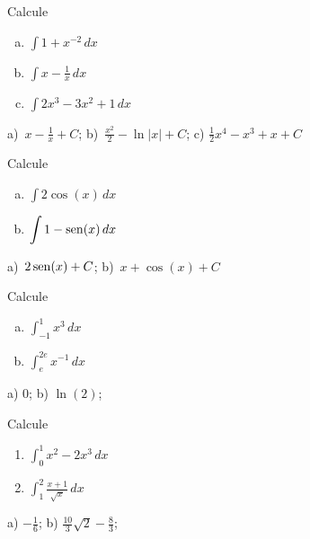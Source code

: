 \begin{exer}
  Calcule
  \begin{enumerate}[a)]
  \item $\displaystyle \int 1 + x^{-2}\,dx$
  \item $\displaystyle \int x - \frac{1}{x}\,dx$
  \item $\displaystyle \int 2x^3 - 3x^2 + 1\,dx$
  \end{enumerate}
\end{exer}
\begin{resp}
  a)~$\displaystyle x-\frac{1}{x}+C$; b)~$\displaystyle \frac{x^2}{2} - \ln|x| + C$; c) $\displaystyle \frac{1}{2}x^4 - x^3 + x + C$
\end{resp}

\begin{exer}
  Calcule
  \begin{enumerate}[a)]
  \item $\displaystyle \int 2\cos(x)\,dx$
  \item $\displaystyle \int 1 - \operatorname{sen}(x)\,dx$
  \end{enumerate}
\end{exer}
\begin{resp}
  a)~$\displaystyle 2\operatorname{sen}(x) + C$; b)~$\displaystyle x + \cos(x) + C$
\end{resp}

\begin{exer}
  Calcule
  \begin{enumerate}[a)]
  \item $\displaystyle \int_{-1}^1 x^3\,dx$
  \item $\displaystyle \int_e^{2e} x^{-1}\,dx$
  \end{enumerate}
\end{exer}
\begin{resp}
  a) $0$; b) $\ln(2)$;
\end{resp}

\begin{exer}
  Calcule
  \begin{enumerate}
  \item $\displaystyle \int_0^1 x^2 - 2x^3\,dx$
  \item $\displaystyle \int_1^2 \frac{x+1}{\sqrt{x}}\,dx$
  \end{enumerate}
\end{exer}
\begin{resp}
  a) $\displaystyle -\frac{1}{6}$; b) $\displaystyle \frac{10}{3}\sqrt{2} - \frac{8}{3}$;
\end{resp}


